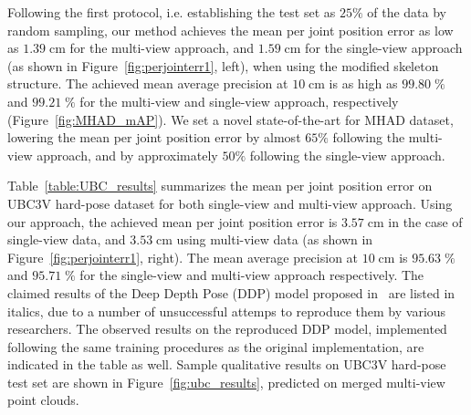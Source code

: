 \noindent
Following the first protocol, i.e. establishing the test set as $25\%$ of the data by random sampling, our method achieves the mean per joint position error as low as $1.39\;\mbox{cm}$ for the multi-view approach, and $1.59\;\mbox{cm}$ for the single-view approach (as shown in Figure~\ref{fig:perjointerr1}, left), when using the modified skeleton structure. The achieved mean average precision at $10 \; \mbox{cm}$ is as high as $99.80 \; \%$ and $99.21 \; \%$ for the multi-view and single-view approach, respectively (Figure~\ref{fig:MHAD_mAP}). We set a novel state-of-the-art for MHAD dataset, lowering the mean per joint position error by  almost $65\%$ following the multi-view approach, and by approximately $50\%$ following the single-view approach.\par
\vspace{5mm}
\noindent
Table~\ref{table:UBC_results} summarizes the mean per joint position error on UBC3V hard-pose dataset for both single-view and multi-view approach. Using our approach, the achieved mean per joint position error is $3.57 \; \mbox{cm}$ in the case of single-view data, and $3.53 \; \mbox{cm}$ using multi-view data (as shown in Figure~\ref{fig:perjointerr1}, right). The mean average precision at $10 \; \mbox{cm}$ is $95.63 \; \%$ and $95.71 \; \%$ for the single-view and multi-view approach respectively. The claimed results of the Deep Depth Pose (DDP) model proposed in~\cite{Marin18jvcir} are listed in italics, due to a number of unsuccessful attemps to reproduce them by various researchers. The observed results on the reproduced DDP model, implemented following the same training procedures as the original implementation, are indicated in the table as well. Sample qualitative results on UBC3V hard-pose test set are shown in Figure~\ref{fig:ubc_results}, predicted on merged multi-view point clouds.\par
\vspace{5mm}

